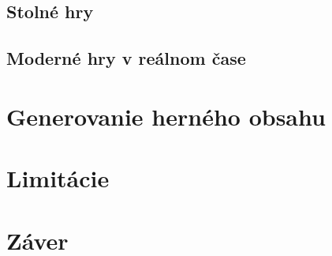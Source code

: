 \documentclass{article}
\begin{document}
\subsection{Stolné hry}
\subsection{Moderné hry v reálnom čase}
\section{Generovanie herného obsahu}
\section{Limitácie}
\section{Záver}
\end{document}
